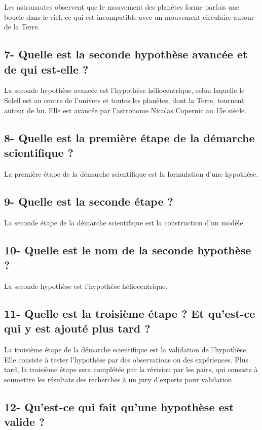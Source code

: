 \documentclass{article}
\begin{document}
Les astronautes observent que le mouvement des planètes forme parfois une boucle dans le ciel, ce qui est incompatible avec un mouvement circulaire autour de la Terre.

\subsection*{7- Quelle est la seconde hypothèse avancée et de qui est-elle ?}

La seconde hypothèse avancée est l'hypothèse héliocentrique, selon laquelle le Soleil est au centre de l'univers et toutes les planètes, dont la Terre, tournent autour de lui. Elle est avancée par l'astronome Nicolas Copernic au 15e siècle.

\subsection*{8- Quelle est la première étape de la démarche scientifique ?}

La première étape de la démarche scientifique est la formulation d'une hypothèse.

\subsection*{9- Quelle est la seconde étape ?}

La seconde étape de la démarche scientifique est la construction d'un modèle.

\subsection*{10- Quelle est le nom de la seconde hypothèse ?}

La seconde hypothèse est l'hypothèse héliocentrique.

\subsection*{11- Quelle est la troisième étape ? Et qu’est-ce qui y est ajouté plus tard ?}

La troisième étape de la démarche scientifique est la validation de l'hypothèse. Elle consiste à tester l'hypothèse par des observations ou des expériences. Plus tard, la troisième étape sera complétée par la révision par les pairs, qui consiste à soumettre les résultats des recherches à un jury d'experts pour validation.

\subsection*{12- Qu’est-ce qui fait qu’une hypothèse est valide ?}
\end{document}
